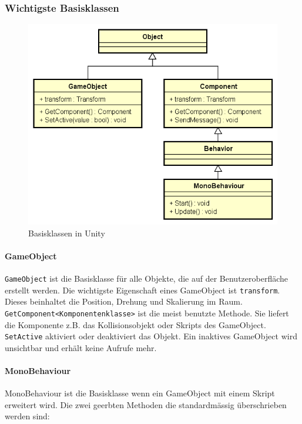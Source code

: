 \subsubsection{Wichtigste Basisklassen}

\begin{figure}[H]
\includegraphics[scale=0.5]{diagramme/unitybaseclasses.png}
\caption{Basisklassen in Unity}
\end{figure}

\paragraph{GameObject}
\lstinline{GameObject} ist die Basisklasse für alle Objekte, die auf der Benutzeroberfläche erstellt werden.
Die wichtigste Eigenschaft eines GameObject ist \lstinline{transform}.
Dieses beinhaltet die Position, Drehung und Skalierung im Raum.
\lstinline{GetComponent<Komponentenklasse>} ist die meist benutzte Methode. 
Sie liefert die Komponente z.B. das Kollisionsobjekt oder Skripts des GameObject. 
\lstinline{SetActive} aktiviert oder deaktiviert das Objekt.
Ein inaktives GameObject wird unsichtbar und erhält keine Aufrufe mehr.

\paragraph{MonoBehaviour}
MonoBehaviour ist die Basisklasse wenn ein GameObject mit einem Skript erweitert wird.
Die zwei geerbten Methoden die standardmässig überschrieben werden sind:

